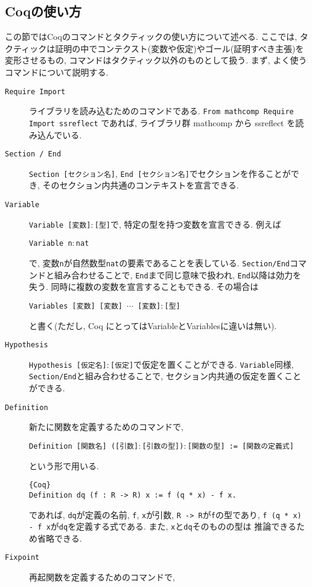 \documentclass[11pt]{jsreport}
\theoremstyle{mystyle}
\newcommand{\0}{\textbf{0}}
\newcommand{\1}{\textbf{1}}
\newcommand{\2}{\textbf{2}}
\begin{document}
\subsection{Coqの使い方} \label{ssec coq_use}
この節ではCoqのコマンドとタクティックの使い方について述べる. ここでは, タクティックは証明の中でコンテクスト(変数や仮定)やゴール(証明すべき主張)を変形させるもの, コマンドはタクティック以外のものとして扱う. 
まず, よく使うコマンドについて説明する. 
\begin{description}
  \item[\tt Require Import]
    ライブラリを読み込むためのコマンドである.
    {\tt From mathcomp Require Import ssreflect}
    であれば, ライブラリ群 mathcomp から ssreflect を読み込んでいる.
  \item[\tt Section / End]
    {\tt Section [セクション名]}, {\tt End [セクション名]}でセクションを作ることができ, 
    そのセクション内共通のコンテキストを宣言できる. 
  \item[\tt Variable]
    {\tt Variable [変数]$\colon$[型]}で, 特定の型を持つ変数を宣言できる. 例えば
    
    {\tt Variable n$\colon$nat}
    
    で, 変数{\tt n}が自然数型{\tt nat}の要素であることを表している. 
    {\tt Section/End}コマンドと組み合わせることで, {\tt End}まで同じ意味で扱われ, 
    {\tt End}以降は効力を失う. 
    同時に複数の変数を宣言することもできる. その場合は
    
    {\tt Variables [変数] [変数] $\cdots$ [変数]$\colon$[型]}
    
    と書く(ただし, Coq にとっては{Variable}と{Variables}に違いは無い).    
  \item[\tt Hypothesis]
    {\tt Hypothesis [仮定名]$\colon$[仮定]}で仮定を置くことができる. {\tt Variable}同様, 
    {\tt Section/End}と組み合わせることで, セクション内共通の仮定を置くことができる. 
  \item[\tt Definition]
    新たに関数を定義するためのコマンドで,
    
    {\tt Definition [関数名] ([引数]$\colon$[引数の型])$\colon$[関数の型] := 
    [関数の定義式]}
    
    という形で用いる. 
    \begin{lstlisting}{Coq}
Definition dq (f : R -> R) x := f (q * x) - f x. \end{lstlisting}
    であれば, {\tt dq}が定義の名前, {\tt f}, {\tt x}が引数, {\tt R -> R}が{\tt f}の型であり, 
    {\tt f (q * x) - f x}が{\tt dq}を定義する式である. また, {\tt x}と{\tt dq}そのものの型は
    推論できるため省略できる. 
  \item[\tt Fixpoint]
    再起関数を定義するためのコマンドで, 
    

\end{description}
\end{document}
